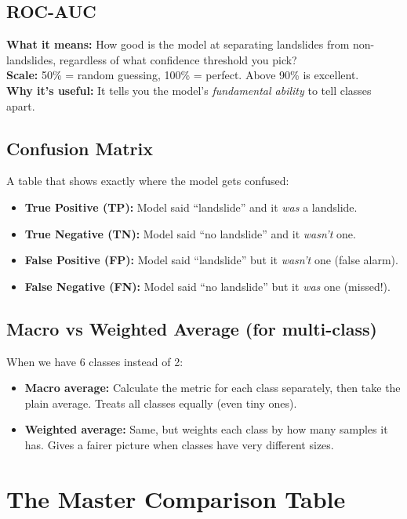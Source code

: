 \documentclass[11pt]{article}
\begin{document}
\subsection{ROC-AUC}
\textbf{What it means:} How good is the model at separating landslides from non-landslides, regardless of what confidence threshold you pick?\\
\textbf{Scale:} 50\% = random guessing, 100\% = perfect. Above 90\% is excellent.\\
\textbf{Why it's useful:} It tells you the model's \emph{fundamental ability} to tell classes apart.

\subsection{Confusion Matrix}
A table that shows exactly where the model gets confused:
\begin{itemize}[nosep]
    \item \textbf{True Positive (TP):} Model said ``landslide'' and it \emph{was} a landslide.
    \item \textbf{True Negative (TN):} Model said ``no landslide'' and it \emph{wasn't} one.
    \item \textbf{False Positive (FP):} Model said ``landslide'' but it \emph{wasn't} one (false alarm).
    \item \textbf{False Negative (FN):} Model said ``no landslide'' but it \emph{was} one (missed!).
\end{itemize}

\subsection{Macro vs Weighted Average (for multi-class)}
When we have 6 classes instead of 2:
\begin{itemize}[nosep]
    \item \textbf{Macro average:} Calculate the metric for each class separately, then take the plain average. Treats all classes equally (even tiny ones).
    \item \textbf{Weighted average:} Same, but weights each class by how many samples it has. Gives a fairer picture when classes have very different sizes.
\end{itemize}

\newpage
\section{The Master Comparison Table}
\end{document}
